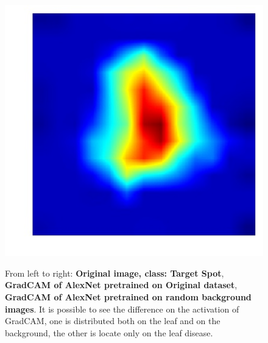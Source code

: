 \begin{figure}
\begin{center}
{			\includegraphics[scale=0.24]{./images/Target_Spot2normal_cam}
		}
		\begin{center}
				\caption{From left to right: \textbf{Original image, class: Target Spot}, \textbf{GradCAM of AlexNet pretrained on Original dataset}, \textbf{GradCAM of AlexNet pretrained on random background images}. It is possible to see the difference on the activation of GradCAM, one is distributed both on the leaf and on the background, the other is locate only on the leaf disease.}
	\label{fig:gradcam}
	\label{fig:long}
	\label{fig:onecol}
		\end{center}
		\vspace{-32pt}
	\end{center}
\end{figure}
